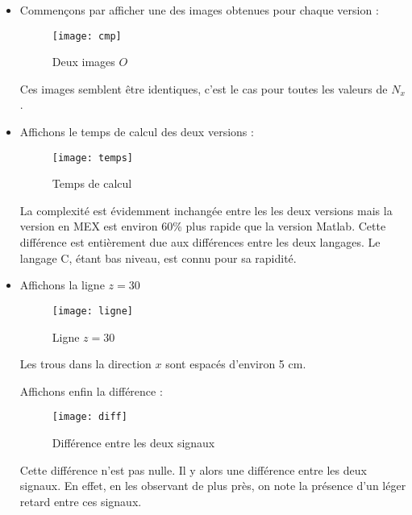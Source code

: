 \documentclass[12pt,a4paper,titlepage]{article}
\begin{document}
\begin{itemize}
    \item{Commençons par afficher une des images obtenues pour chaque version :

            \begin{figure}[H]
                \caption{Deux images $O$}
                \texttt{[image: cmp]}
                \centering
            \end{figure}

            Ces images semblent être identiques, c'est le cas pour toutes les valeurs de $N_x$.
        }
    \item{Affichons le temps de calcul des deux versions :

            \begin{figure}[H]
                \caption{Temps de calcul}
                \texttt{[image: temps]}
                \centering
            \end{figure}

            La complexité est évidemment inchangée entre les les deux versions mais la version en MEX
            est environ 60\% plus rapide que la version Matlab. Cette différence est entièrement
            due aux différences entre les deux langages. Le langage C, étant bas niveau, est
            connu pour sa rapidité.
        }
    \item{Affichons la ligne $z = 30$

            \begin{figure}[H]
                \caption{Ligne $z = 30$}
                \texttt{[image: ligne]}
                \centering
            \end{figure}

            Les trous dans la direction $x$ sont espacés d'environ 5 cm.

            Affichons enfin la différence :

            \begin{figure}[H]
                \caption{Différence entre les deux signaux}
                \texttt{[image: diff]}
                \centering
            \end{figure}

            Cette différence n'est pas nulle. Il y alors une différence entre les deux signaux.
            En effet, en les observant de plus près, on note la présence d'un léger retard entre
            ces signaux.
        }
\end{itemize}
\end{document}
